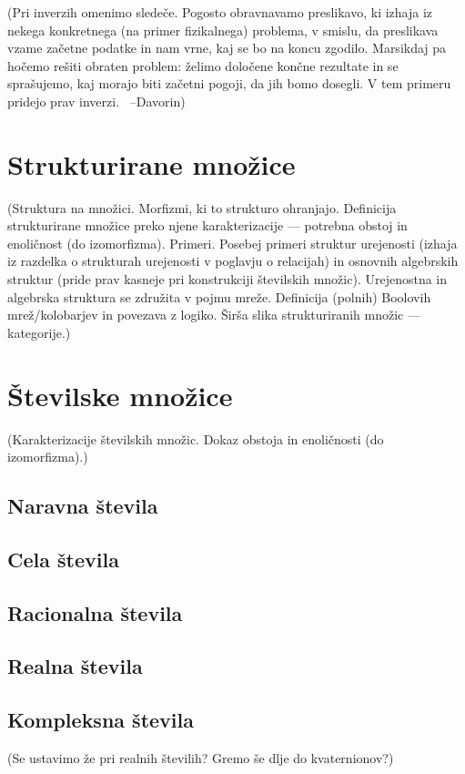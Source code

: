 \documentclass[11pt,a4paper,twoside]{book}
\newcommand{\davorin}[1]{{\small\textcolor{davorincolor}{(#1 \ \mbox{--Davorin})}}}
\newcommand{\note}[1]{{\small\textcolor{notecolor}{(#1)}}}
\begin{document}
			\davorin{Pri inverzih omenimo sledeče. Pogosto obravnavamo preslikavo, ki izhaja iz nekega konkretnega (na primer fizikalnega) problema, v smislu, da preslikava vzame začetne podatke in nam vrne, kaj se bo na koncu zgodilo. Marsikdaj pa hočemo rešiti obraten problem: želimo določene končne rezultate in se sprašujemo, kaj morajo biti začetni pogoji, da jih bomo dosegli. V tem primeru pridejo prav inverzi.}
	
	
	
	\chapter{Strukturirane množice}
		\note{Struktura na množici. Morfizmi, ki to strukturo ohranjajo. Definicija strukturirane množice preko njene karakterizacije --- potrebna obstoj in enoličnost (do izomorfizma). Primeri. Posebej primeri struktur urejenosti (izhaja iz razdelka o strukturah urejenosti v poglavju o relacijah) in osnovnih algebrskih struktur (pride prav kasneje pri konstrukciji številskih množic). Urejenostna in algebrska struktura se združita v pojmu mreže. Definicija (polnih) Boolovih mrež/kolobarjev in povezava z logiko. Širša slika strukturiranih množic --- kategorije.}
	
	\chapter{Številske množice}
		\note{Karakterizacije številskih množic. Dokaz obstoja in enoličnosti (do izomorfizma).}
		\section{Naravna števila}
		\section{Cela števila}
		\section{Racionalna števila}
		\section{Realna števila}
		\section{Kompleksna števila}
			\note{Se ustavimo že pri realnih številih? Gremo še dlje do kvaternionov?}
	
\end{document}
